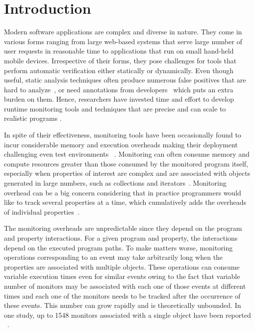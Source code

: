 \section{Introduction}
\label{sec:introduction}

Modern software applications are complex and diverse in nature. They come in 
various forms ranging from large web-based systems that serve large number of 
user requests in reasonable time to applications that run on small hand-held 
mobile devices. Irrespective of their forms, they pose challenges for tools that 
perform automatic verification either statically or dynamically. Even though 
useful, static analysis techniques often produce numerous false positives 
that are hard to analyze~\cite{Deline04,Naeem:ECOOP08}, or need
annotations from developers~\cite{Bierhoff:ECOOP09, Bierhoff:OOPSLA07} which puts
an extra burden on them. Hence, researchers have invested time and 
effort to develop runtime monitoring tools and techniques that are precise
and can scale to realistic programs \cite{Allan:OOPSLA05, Arnold:OOPSLA08, chen2005, Reger2015}.

In spite of their effectiveness, monitoring tools have been occasionally found 
to incur considerable memory and execution overheads making their deployment 
challenging even
test environments ~\cite{Purandare:2013}.
Monitoring can often consume memory and compute resources 
greater than those 
consumed by the monitored program itself,
especially when properties of interest are complex and are associated with objects 
generated in large numbers, such as collections and iterators~\cite{chen2009}. 
Monitoring overhead can be a big concern considering that in practice 
programmers would like to track several properties at a time, which cumulatively 
adds the overheads of individual properties~\cite{luo-2014, Purandare:2013}.

The monitoring overheads are unpredictable since they depend on the program and 
property interactions. For a given program and property, the interactions depend 
on the executed program paths. To make matters worse, 
monitoring operations corresponding to an event may take arbitrarily long when 
the properties are associated with multiple objects.
These operations can consume variable 
execution times even for similar events owing to the fact that variable number 
of monitors may be associated with each one of those events at different times
and each one of the 
monitors needs to be tracked after the occurrence of these events. This number 
can grow rapidly and is theoretically unbounded. In one study, up to 1548 monitors
associated with a single object have been reported ~\cite{Purandare:2013}.


